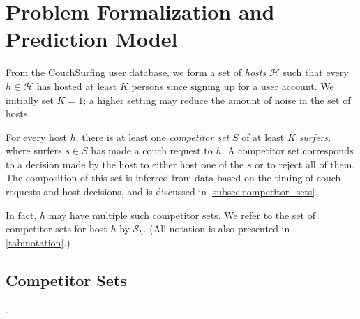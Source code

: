 \section{Problem Formalization and Prediction Model} \label{sec:model}

From the CouchSurfing user database, we form a set of \emph{hosts} $\mathcal{H}$ such that every $h \in \mathcal{H}$ has hosted at least $K$ persons since signing up for a user account.
We initially set $K=1$; a higher setting may reduce the amount of noise in the set of hosts.

For every host $h$, there is at least one \emph{competitor set} $S$ of at least $K$ \emph{surfers}, where surfers $s \in S$ has made a couch request to $h$.
A competitor set corresponds to a decision made by the host to either host one of the $s$ or to reject all of them.
The composition of this set is inferred from data based on the timing of couch requests and host decisions, and is discussed in \autoref{subsec:competitor_sets}.

In fact, $h$ may have multiple such competitor sets.
We refer to the set of competitor sets for host $h$ by $\mathcal{S}_h$.
(All notation is also presented in \autoref{tab:notation}.)


\subsection{Competitor Sets} \label{subsec:competitor_sets}
.

